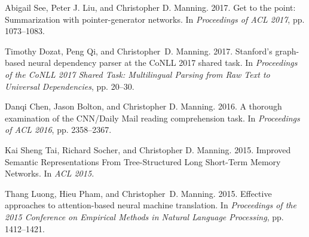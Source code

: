 \documentclass[11pt]{article}
\begin{document}
\begin{vita}
\begin{Representative Publications}

\item Abigail See, Peter J. Liu, and Christopher D. Manning. 2017. Get
  to the point: Summarization with pointer-generator networks. In
  \emph{Proceedings of ACL 2017}, pp. 1073–1083.

\item Timothy Dozat, Peng Qi, and Christopher~D. Manning. 2017. Stanford's graph-based neural dependency parser at the {CoNLL} 2017
  shared task. In {\em Proceedings of the CoNLL 2017 Shared Task: Multilingual                                                                             
  Parsing from Raw Text to Universal Dependencies}, pp. 20--30.



\item Danqi Chen, Jason Bolton, and Christopher D. Manning. 2016. A
  thorough examination of the CNN\slash Daily Mail reading
  comprehension task. In \emph{Proceedings of ACL 2016}, pp. 2358–2367.

\item Kai Sheng Tai, Richard Socher, and Christopher
  D. Manning. 2015. Improved Semantic Representations From
  Tree-Structured Long Short-Term Memory Networks. In
  \emph{ACL 2015.}

\item Thang Luong, Hieu Pham, and Christopher~D. Manning. 2015. Effective approaches to attention-based neural machine translation.
\newblock In {\em Proceedings of the 2015 Conference on Empirical Methods in                                                                          
 Natural Language Processing}, pp. 1412--1421.

\end{Representative Publications}


\end{vita}
\end{document}

